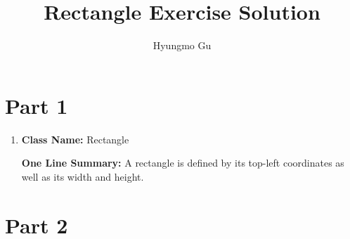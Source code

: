 \documentclass[12pt]{article}
\begin{document}
\title{Rectangle Exercise Solution}
\author{Hyungmo Gu}
\maketitle

\section*{Part 1}
\begin{enumerate}
    \item

    \textbf{Class Name:} Rectangle

    \bigskip

    \textbf{One Line Summary:} A rectangle is defined by its top-left coordinates
    as well as its width and height.


\end{enumerate}

\section*{Part 2}
\end{document}
